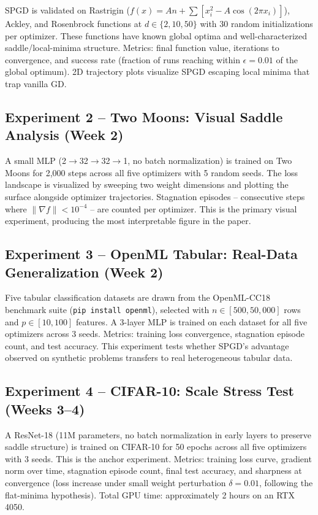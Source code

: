 \documentclass[11pt]{article}
\begin{document}
SPGD is validated on Rastrigin ($f(x) = An + \sum[x_i^2 - A\cos(2\pi x_i)]$), Ackley, and Rosenbrock functions at $d \in \{2, 10, 50\}$ with 30 random initializations per optimizer. These functions have known global optima and well-characterized saddle/local-minima structure. Metrics: final function value, iterations to convergence, and success rate (fraction of runs reaching within $\epsilon = 0.01$ of the global optimum). 2D trajectory plots visualize SPGD escaping local minima that trap vanilla GD.

\subsection*{Experiment 2 -- Two Moons: Visual Saddle Analysis (Week 2)}

A small MLP (2$\to$32$\to$32$\to$1, no batch normalization) is trained on Two Moons for 2{,}000 steps across all five optimizers with 5 random seeds. The loss landscape is visualized by sweeping two weight dimensions and plotting the surface alongside optimizer trajectories. Stagnation episodes -- consecutive steps where $\|\nabla f\| < 10^{-4}$ -- are counted per optimizer. This is the primary visual experiment, producing the most interpretable figure in the paper.

\subsection*{Experiment 3 -- OpenML Tabular: Real-Data Generalization (Week 2)}

Five tabular classification datasets are drawn from the OpenML-CC18 benchmark suite (\texttt{pip install openml}), selected with $n \in [500, 50{,}000]$ rows and $p \in [10, 100]$ features. A 3-layer MLP is trained on each dataset for all five optimizers across 3 seeds. Metrics: training loss convergence, stagnation episode count, and test accuracy. This experiment tests whether SPGD's advantage observed on synthetic problems transfers to real heterogeneous tabular data.

\subsection*{Experiment 4 -- CIFAR-10: Scale Stress Test (Weeks 3--4)}

A ResNet-18 (11M parameters, no batch normalization in early layers to preserve saddle structure) is trained on CIFAR-10 for 50 epochs across all five optimizers with 3 seeds. This is the anchor experiment. Metrics: training loss curve, gradient norm over time, stagnation episode count, final test accuracy, and sharpness at convergence (loss increase under small weight perturbation $\delta = 0.01$, following the flat-minima hypothesis). Total GPU time: approximately 2 hours on an RTX 4050.
\end{document}
